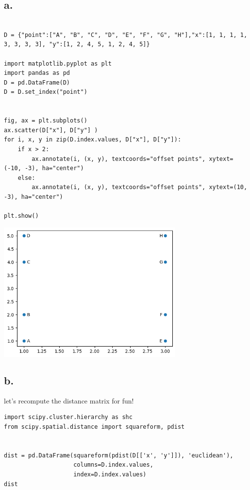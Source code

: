 \documentclass[11pt]{article}
\begin{document}
\subsection*{a.}
\label{sec:org4a47c85}
\begin{verbatim}

D = {"point":["A", "B", "C", "D", "E", "F", "G", "H"],"x":[1, 1, 1, 1, 3, 3, 3, 3], "y":[1, 2, 4, 5, 1, 2, 4, 5]}

import matplotlib.pyplot as plt
import pandas as pd
D = pd.DataFrame(D)
D = D.set_index("point")


fig, ax = plt.subplots()
ax.scatter(D["x"], D["y"] )
for i, x, y in zip(D.index.values, D["x"], D["y"]):
    if x > 2:
        ax.annotate(i, (x, y), textcoords="offset points", xytext=(-10, -3), ha="center")
    else:
        ax.annotate(i, (x, y), textcoords="offset points", xytext=(10, -3), ha="center")

plt.show()
\end{verbatim}

\begin{center}
\includegraphics[width=0.7\textwidth]{scatter.png}
\end{center}
\subsection*{b.}
\label{sec:org102ca9a}
let's recompute the distance matrix for fun!
\begin{verbatim}
import scipy.cluster.hierarchy as shc
from scipy.spatial.distance import squareform, pdist


dist = pd.DataFrame(squareform(pdist(D[['x', 'y']]), 'euclidean'),
                    columns=D.index.values,
                    index=D.index.values)
dist
\end{verbatim}
\end{document}
